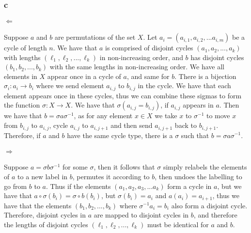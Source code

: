 \documentclass[]{article}
\begin{document}
\subsubsection*{c}
\paragraph{$\Leftarrow$}
Suppose $a$ and $b$ are permutations of the set $X$. Let $a_i = (a_{i, 1}, a_{i, 2}, ...a_{i, m})$ be a cycle of length $n$. We have that $a$ is comprised of disjoint cycles $(a_1, a_2, ..., a_k)$ with lengths $(\ell_1, \ell_2, ..., \ell_k)$ in non-increasing order, and $b$ has disjoint cycles $(b_1, b_2, ..., b_k)$ with the same lengths in non-increasing order. We have all elements in $X$ appear once in a cycle of $a$, and same for $b$. There is a bijection $\sigma_i : a_i \rightarrow b_i$ where we send element $a_{i, j}$ to $b_{i, j}$ in the cycle. We have that each element appears once in these cycles, thus we can combine these sigmas to form the function $\sigma: X \rightarrow X$. We have that $\sigma(a_{i, j} = b_{i,j})$, if $a_{i,j}$ appears in $a$. Then we have that $b = \sigma a \sigma^{-1}$, as for any element $x \in X$ we take $x$ to $\sigma^{-1}$ to move $x$ from $b_{i,j}$ to $a_{i,j}$, cycle $a_{i,j}$ to $a_{i, j+1}$ and then send $a_{i, j+1}$ back to $b_{i, j+1}$. Therefore, if $a$ and $b$ have the same cycle type, there is a $\sigma$ such that $b = \sigma a \sigma^{-1}$. 
\paragraph{$\Rightarrow$}
Suppose $a = \sigma b \sigma^{-1}$ for some $\sigma$, then it follows that $\sigma$ simply relabels the elements of $a$ to a new label in $b$, permutes it according to $b$, then undoes the labelling to go from $b$ to $a$. Thus if the elements $(a_1, a_2, a_3, ... a_k)$ form a cycle in $a$, but we have that $a \circ \sigma(b_i) = \sigma \circ b(b_i)$, but $\sigma(b_i) = a_i$ and $a (a_i) = a_{i+1}$, thus we have that the elements $(b_1, b_2, ..., b_k) $ where $\sigma^{-1} a_i = b_i$ also form a disjoint cycle. Therefore, disjoint cycles in $a$ are mapped to disjoint cycles in $b$, and therefore the lengths of disjoint cycles $(\ell_1, \ell_2, ..., \ell_k)$ must be identical for $a$ and $b$. 
\end{document}
